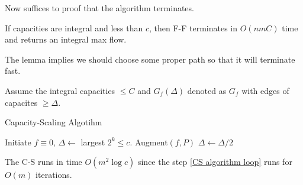 Now suffices to proof that the algorithm terminates.

\begin{lemma}
    If capacities are integral and less than  $ c $, then F-F terminates in  $ O(nmC) $ time and returns an integral max flow.  
\end{lemma}

The lemma implies we should choose some proper path so that it will terminate fast.

Assume the integral capacities  $  \leq C $ and  $ G_f(\Delta) $ denoted as  $ G_f $ with edges of capacites  $  \geq \Delta $.    
\begin{algorithm}
    \caption{Capacity-Scaling Algotihm}
    \begin{algorithmic}[1]
        \STATE Initiate  $ f\equiv 0 $,  $ \Delta\leftarrow  $ largest  $ 2^k \leq c $.  
        \label{CS algorithm loop}
                \STATE Augment$ (f,P) $
            \ENDWHILE
            \STATE $ \Delta\leftarrow \Delta/2 $ 
        \ENDWHILE
    \end{algorithmic}
\end{algorithm}

\begin{theorem}
    The C-S runs in time  $ O(m^2\log c) $ since the step \ref{CS algorithm loop} runs for  $ O(m) $ iterations. 
\end{theorem}
